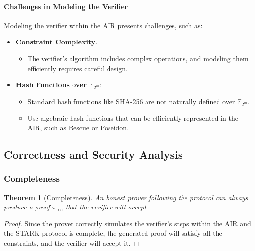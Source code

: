 \documentclass{article}
\theoremstyle{plain}
\newtheorem{theorem}{Theorem}[section]
\theoremstyle{definition}
\theoremstyle{remark}
\theoremstyle{problem}
\begin{document}
\paragraph{Challenges in Modeling the Verifier}

Modeling the verifier within the AIR presents challenges, such as:

\begin{itemize}
    \item \textbf{Constraint Complexity}:

    \begin{itemize}
        \item The verifier's algorithm includes complex operations, and modeling them efficiently requires careful design.
    \end{itemize}

    \item \textbf{Hash Functions over $\mathbb{F}_{2^m}$}:

    \begin{itemize}
        \item Standard hash functions like SHA-256 are not naturally defined over $\mathbb{F}_{2^m}$.
        \item Use algebraic hash functions that can be efficiently represented in the AIR, such as Rescue or Poseidon.
    \end{itemize}
\end{itemize}

\subsection{Correctness and Security Analysis}

\subsubsection{Completeness}

\begin{theorem}[Completeness]
An honest prover following the protocol can always produce a proof $\pi_{\text{rec}}$ that the verifier will accept.
\end{theorem}

\begin{proof}
Since the prover correctly simulates the verifier's steps within the AIR and the STARK protocol is complete, the generated proof will satisfy all the constraints, and the verifier will accept it.
\end{proof}
\end{document}
